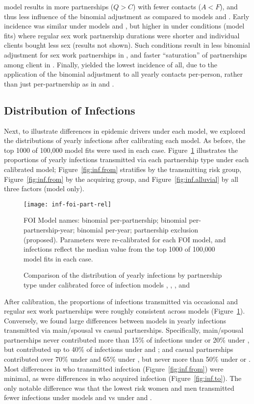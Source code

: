 model  results in more partnerships ($Q > C$) with fewer contacts ($A < F$),
and thus less influence of the binomial adjustment as compared to models  and .
Early incidence was similar under models  and ,
but higher in  under conditions (model fits) where
regular sex work partnership durations were shorter and
individual clients bought less sex (results not shown).
Such conditions result in less binomial adjustment for sex work partnerships in ,
and faster ``saturation'' of partnerships among client in .
Finally,  yielded the lowest incidence of all,
due to the application of the binomial adjustment to all yearly contacts per-person,
rather than just per-partnership as in  and .
\par
\clearpage
\subsection{Distribution of Infections}\label{exp.inf}
Next, to illustrate differences in epidemic drivers under each model,
we explored the distributions of yearly infections after calibrating each model.
As before, the top 1000 of 100,000 model fits were used in each case.
Figure~\ref{fig:inf.part} illustrates the proportions of yearly infections
transmitted via each partnership type under each calibrated model;
Figure~\ref{fig:inf.from} stratifies by the transmitting risk group,
Figure~\ref{fig:inf.from} by the acquiring group, and
Figure~\ref{fig:inf.alluvial} by all three factors (model  only).
\begin{figure}[h]
  \centerline{\texttt{[image: inf-foi-part-rel]}}
  \caption{Comparison of the distribution of yearly infections by partnership type
    under calibrated force of infection models , , , and }
  \label{fig:inf.part}
  \floatfoot
  FOI Model names:
   binomial per-partnership;
   binomial per-partnership-year;
   binomial per-year;
   partnership exclusion (proposed).
  Parameters were re-calibrated for each FOI model,
  and infections reflect the median value from
  the top 1000 of 100,000 model fits in each case.
\end{figure}
\par
After calibration, the proportions of infections transmitted
via occasional and regular sex work partnerships were roughly consistent across models
(Figure~\ref{fig:inf.part}).
Conversely, we found large differences between models in yearly infections transmitted
via main/spousal vs casual partnerships.
Specifically, main/spousal partnerships
never contributed more than 15\% of infections under  or 20\% under ,
but contributed up to 40\% of infections under  and ;
and casual partnerships contributed over 70\% under  and 65\% under ,
but never more than 50\% under  or .
Most differences in who transmitted infection (Figure~\ref{fig:inf.from}) were minimal,
as were differences in who acquired infection (Figure~\ref{fig:inf.to}).
The only notable difference was that the lowest risk women and men
transmitted fewer infections under models  and  vs under  and .
